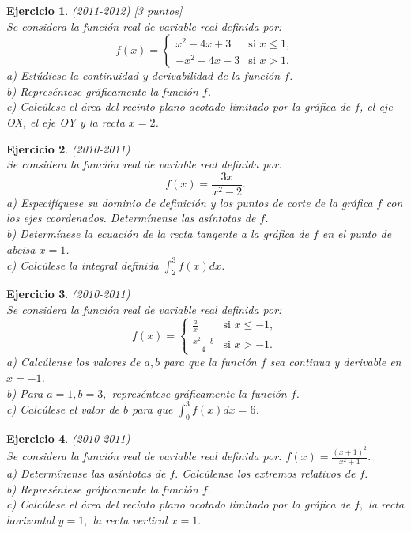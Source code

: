 \documentclass[12pt, a4paper]{amsart}
\newtheorem{ejer}{Ejercicio}
\begin{document}
\begin{ejer}\em (2011-2012) [3 puntos]\\
Se considera la función real de variable real definida por:
\begin{equation*}
f(x)=\left \{ \begin{matrix} x^2-4x+3 & \mbox{si } x\leq 1,
\\ -x^2+4x-3 & \mbox{si } x > 1. \end{matrix}\right. 
\end{equation*}
a) Estúdiese la continuidad y derivabilidad de la función $f$.\\
b) Represéntese gráficamente la función $f$.\\
c) Calcúlese el área del recinto plano acotado limitado por la gráfica de $f$, el eje OX, el eje OY y la recta $x=2$.
\end{ejer}


\begin{ejer}\em (2010-2011)\\%
Se considera la función real de variable real definida por:
$$
f(x)=\frac{3x}{x^2-2}.
$$
a) Especifíquese su dominio de definición y los puntos de corte de la gráfica $f$ con los ejes coordenados. Determínense las asíntotas de $f$.\\
b) Determínese la ecuación de la recta tangente a la gráfica de $f$ en el punto de abcisa $x=1$.\\
c) Calcúlese la integral definida $\int_2^3f(x)dx$.
\end{ejer}

\begin{ejer}\em (2010-2011)\\%
Se considera la función real de variable real definida por:
\begin{equation*}
f(x)=\left \{ \begin{matrix} \frac{a}{x} & \mbox{si } x\leq -1,
\\ \frac{x^2-b}{4} & \mbox{si } x > -1. \end{matrix}\right. 
\end{equation*}
a) Calcúlense los valores de $a,b$ para que la función $f$ sea continua y derivable en $x=-1$.\\
b) Para $a=1,b=3,$ represéntese gráficamente la función $f$.\\
c) Calcúlese el valor de $b$ para que $\int_0^3f(x)dx=6$.
\end{ejer}

\begin{ejer}\em (2010-2011)\\
Se considera la función real de variable real definida por: $f(x)=\frac{(x+1)^2}{x^2+1}.$\\
a) Determínense las asíntotas de $f.$ Calcúlense los extremos relativos de $f.$\\
b) Represéntese gráficamente la función $f.$\\
c) Calcúlese el área del recinto plano acotado limitado por la gráfica de $f,$ la recta horizontal $y=1,$ la recta vertical $x=1.$
\end{ejer}
\end{document}
